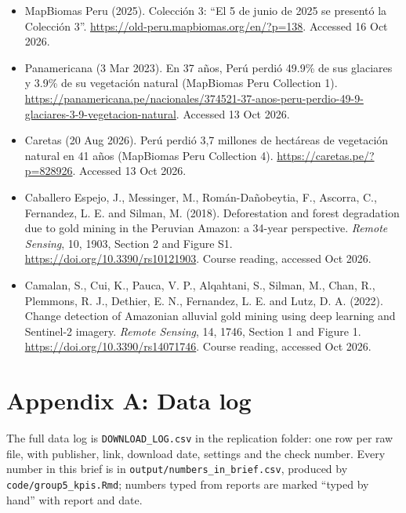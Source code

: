 \documentclass[10pt,a4paper]{article}
\begin{document}
{\begin{itemize}
\item MapBiomas Peru (2025). Colección 3: ``El 5 de junio de 2025 se presentó la Colección 3''. \url{https://old-peru.mapbiomas.org/en/?p=138}. Accessed 16 Oct 2026.
\item Panamericana (3 Mar 2023). En 37 años, Perú perdió 49.9\% de sus glaciares y 3.9\% de su vegetación natural (MapBiomas Peru Collection 1). \url{https://panamericana.pe/nacionales/374521-37-anos-peru-perdio-49-9-glaciares-3-9-vegetacion-natural}. Accessed 13 Oct 2026.
\item Caretas (20 Aug 2026). Perú perdió 3,7 millones de hectáreas de vegetación natural en 41 años (MapBiomas Peru Collection 4). \url{https://caretas.pe/?p=828926}. Accessed 13 Oct 2026.
\item Caballero Espejo, J., Messinger, M., Román-Dañobeytia, F., Ascorra, C., Fernandez, L. E. and Silman, M. (2018). Deforestation and forest degradation due to gold mining in the Peruvian Amazon: a 34-year perspective. \emph{Remote Sensing}, 10, 1903, Section 2 and Figure S1. \url{https://doi.org/10.3390/rs10121903}. Course reading, accessed Oct 2026.
\item Camalan, S., Cui, K., Pauca, V. P., Alqahtani, S., Silman, M., Chan, R., Plemmons, R. J., Dethier, E. N., Fernandez, L. E. and Lutz, D. A. (2022). Change detection of Amazonian alluvial gold mining using deep learning and Sentinel-2 imagery. \emph{Remote Sensing}, 14, 1746, Section 1 and Figure 1. \url{https://doi.org/10.3390/rs14071746}. Course reading, accessed Oct 2026.
\end{itemize}}

\section*{Appendix A: Data log}
{\small The full data log is \texttt{DOWNLOAD\_LOG.csv} in the replication folder: one row per raw file, with publisher, link, download date, settings and the check number. Every number in this brief is in \nolinkurl{output/numbers_in_brief.csv}, produced by \nolinkurl{code/group5_kpis.Rmd}; numbers typed from reports are marked ``typed by hand'' with report and date.}
\end{document}
